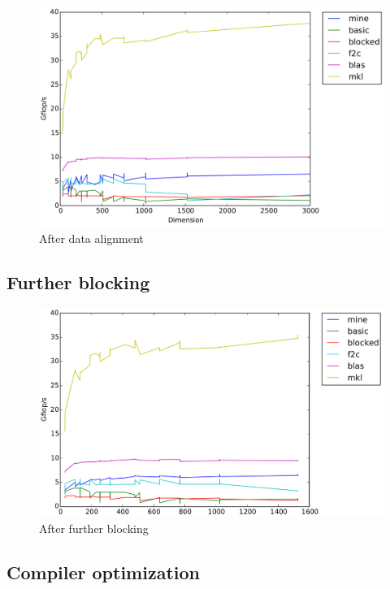 \documentclass[11pt]{article}
\begin{document}
        \begin{figure}[H]
            \centering
            \includegraphics[width=4.5in]{timing_vector_32_cp_align.png}
            \caption{After data alignment}
        \end{figure}
        
        
        
        \subsection{Further blocking}
        
        \begin{figure}[H]
            \centering
            \includegraphics[width=5in]{timing_vector_32_64_cp_align.png}
            \caption{After further blocking}
        \end{figure}
        
        \clearpage
                        
        
            
        \subsection{Compiler optimization}
        
\end{document}
